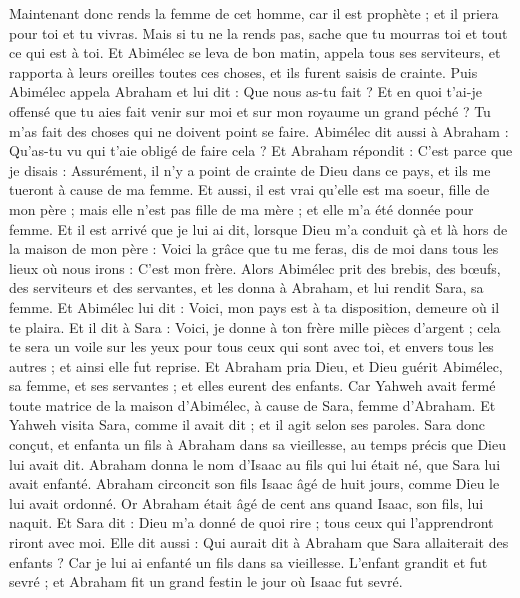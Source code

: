 \begin{multicols}{2}
Maintenant donc rends la femme de cet homme, car il est prophète ; et il priera pour toi et tu vivras. Mais si tu ne la rends pas, sache que tu mourras toi et tout ce qui est à toi.
Et Abimélec se leva de bon matin, appela tous ses serviteurs, et rapporta à leurs oreilles toutes ces choses, et ils furent saisis de crainte.
Puis Abimélec appela Abraham et lui dit : Que nous as-tu fait ? Et en quoi t'ai-je offensé que tu aies fait venir sur moi et sur mon royaume un grand péché ? Tu m'as fait des choses qui ne doivent point se faire.
Abimélec dit aussi à Abraham : Qu'as-tu vu qui t'aie obligé de faire cela ?
Et Abraham répondit : C'est parce que je disais : Assurément, il n'y a point de crainte de Dieu dans ce pays, et ils me tueront à cause de ma femme.
Et aussi, il est vrai qu'elle est ma soeur, fille de mon père ; mais elle n'est pas fille de ma mère ; et elle m'a été donnée pour femme.
Et il est arrivé que je lui ai dit, lorsque Dieu m'a conduit çà et là hors de la maison de mon père : Voici la grâce que tu me feras, dis de moi dans tous les lieux où nous irons : C'est mon frère.
Alors Abimélec prit des brebis, des bœufs, des serviteurs et des servantes, et les donna à Abraham, et lui rendit Sara, sa femme.
Et Abimélec lui dit : Voici, mon pays est à ta disposition, demeure où il te plaira.
Et il dit à Sara : Voici, je donne à ton frère mille pièces d'argent ; cela te sera un voile sur les yeux pour tous ceux qui sont avec toi, et envers tous les autres ; et ainsi elle fut reprise.
Et Abraham pria Dieu, et Dieu guérit Abimélec, sa femme, et ses servantes ; et elles eurent des enfants.
Car Yahweh avait fermé toute matrice de la maison d'Abimélec, à cause de Sara, femme d'Abraham.
\VerseOne{}Et Yahweh visita Sara, comme il avait dit ; et il agit selon ses paroles.
Sara donc conçut, et enfanta un fils à Abraham dans sa vieillesse, au temps précis que Dieu lui avait dit.
Abraham donna le nom d'Isaac au fils qui lui était né, que Sara lui avait enfanté.
Abraham circoncit son fils Isaac âgé de huit jours, comme Dieu le lui avait ordonné.
Or Abraham était âgé de cent ans quand Isaac, son fils, lui naquit.
Et Sara dit : Dieu m'a donné de quoi rire ; tous ceux qui l'apprendront riront avec moi.
Elle dit aussi : Qui aurait dit à Abraham que Sara allaiterait des enfants ? Car je lui ai enfanté un fils dans sa vieillesse.
L'enfant grandit et fut sevré ; et Abraham fit un grand festin le jour où Isaac fut sevré.

\end{multicols}
